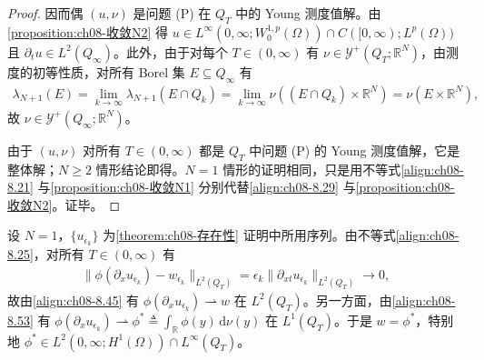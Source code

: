 \documentclass[../../main.tex]{subfiles}%
\begin{document}
\begin{proof}
因而偶 $(u,\nu)$ 是问题 (P) 在 $Q_T$ 中的 Young 测度值解。由\cref{proposition:ch08-收敛N2} 得 $u\in L^\infty(0,\infty;W^{1,p}_0(\Omega))\cap C([0,\infty);L^p(\Omega))$ 且 $\partial_t u\in L^2(Q_\infty)$。此外，由于对每个 $T\in(0,\infty)$ 有 $\nu\in\mathcal{Y}^+(Q_T;\mathbb{R}^N)$，由测度的初等性质，对所有 Borel 集 $E\subseteq Q_\infty$ 有
\begin{align*}
\lambda_{N+1}(E)=\lim_{k\to\infty}\lambda_{N+1}(E\cap Q_k)=\lim_{k\to\infty}\nu((E\cap Q_k)\times\mathbb{R}^N)=\nu(E\times\mathbb{R}^N),
\end{align*}
故 $\nu\in\mathcal{Y}^+(Q_\infty;\mathbb{R}^N)$。

由于 $(u,\nu)$ 对所有 $T\in(0,\infty)$ 都是 $Q_T$ 中问题 (P) 的 Young 测度值解，它是整体解；$N\geqslant2$ 情形结论即得。$N=1$ 情形的证明相同，只是用不等式\eqref{align:ch08-8.21} 与\cref{proposition:ch08-收敛N1} 分别代替\eqref{align:ch08-8.29} 与\cref{proposition:ch08-收敛N2}。证毕。
\end{proof}

\begin{remark}\label{remark:ch08-w等于phi星}
设 $N=1$，$\{u_{\epsilon_k}\}$ 为\cref{theorem:ch08-存在性} 证明中所用序列。由不等式\eqref{align:ch08-8.25}，对所有 $T\in(0,\infty)$ 有
\begin{align*}
\|\phi(\partial_x u_{\epsilon_k})-w_{\epsilon_k}\|_{L^2(Q_T)}=\epsilon_k\|\partial_{xt}u_{\epsilon_k}\|_{L^2(Q_T)}\to0,
\end{align*}
故由\eqref{align:ch08-8.45} 有 $\phi(\partial_x u_{\epsilon_k})\rightharpoonup w$ 在 $L^2(Q_T)$。另一方面，由\eqref{align:ch08-8.53} 有 $\phi(\partial_x u_{\epsilon_k})\rightharpoonup\phi^*\triangleq \int_{\mathbb{R}}\phi(y)\,\mathrm{d}\nu(y)$ 在 $L^1(Q_T)$。于是 $w=\phi^*$，特别地 $\phi^*\in L^2(0,\infty;H^1(\Omega))\cap L^\infty(Q_T)$。
\end{remark}
\end{document}
